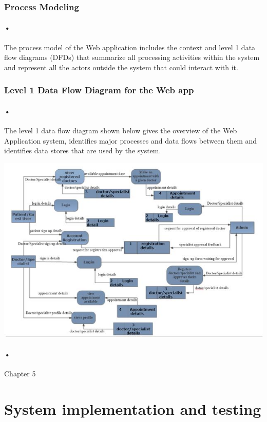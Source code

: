 \documentclass[12pt]{article}
\begin{document}
\subsubsection{Process Modeling}
\paragraph{•}The process model of the Web application includes the context and level 1 data flow diagrams (DFDs) that summarize all processing activities within the system and represent all the actors outside the system that could interact with it.

\subsubsection{Level 1 Data Flow Diagram for the Web app}
\paragraph{•}The level 1 data flow diagram shown below gives the overview of the Web Application system, identifies major processes and data flows between them and identifies data stores that are used by the system.

\begin{center}
\includegraphics[scale=1.2]{dfd}
\end{center}

\paragraph{•}Chapter 5

\section{System implementation and testing}
\end{document}

